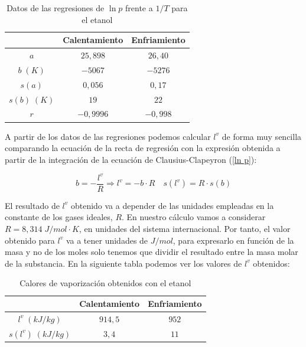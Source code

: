 \documentclass[a4paper,12pt,titlepage]{article}
\begin{document}
\begin{table}[h!]
\centering
\begin{tabular}{c|c|c|}
\cline{2-3}
                                  & Calentamiento & Enfriamiento \\ \hline
\multicolumn{1}{|c|}{$a$}         & $25,898$ & $26,40$ \\ \hline
\multicolumn{1}{|c|}{$b\;(K)$}    & $-5067$ & $-5276$ \\ \hline
\multicolumn{1}{|c|}{$s(a)$}      & $0,056$ & $0,17$ \\ \hline
\multicolumn{1}{|c|}{$s(b)\;(K)$} & $19$ & $22$ \\ \hline
\multicolumn{1}{|c|}{$r$}         & $-0,9996$ & $-0,998$ \\ \hline
\end{tabular}
\caption{Datos de las regresiones de $\ln p$ frente a $1/T$ para el etanol}
\label{tab:my-table}
\end{table}

A partir de los datos de las regresiones podemos calcular $l^v$ de forma muy sencilla comparando la ecuación de la recta de regresión con la expresión obtenida a partir de la integración de la ecuación de Clausius-Clapeyron (\ref{ln p}):

\begin{equation}
    b = -\frac{l^v}{R} \Rightarrow l^v = -b\cdot R \quad s(l^v) = R\cdot s(b)
    \label{s_l^v}
\end{equation}

El resultado de $l^v$ obtenido va a depender de las unidades empleadas en la constante de los gases ideales, $R$. En nuestro cálculo vamos a considerar $R=8,314 \;J/mol\cdot K$, en unidades del sistema internacional. Por tanto, el valor obtenido para $l^v$ va a tener unidades de $J/mol$, para expresarlo en función de la masa y no de los moles solo tenemos que dividir el resultado entre la masa molar de la substancia. En la siguiente tabla podemos ver los valores de $l^v$ obtenidos:

\begin{table}[h!]
\centering
\begin{tabular}{c|c|c|}
\cline{2-3}
    & Calentamiento & Enfriamiento \\ \hline
\multicolumn{1}{|c|}{$l^v\;(kJ/kg)$}    & $914,5$ & $952$ \\ \hline
\multicolumn{1}{|c|}{$s(l^v)\;(kJ/kg)$} & $3,4$ & $11$ \\ \hline
\end{tabular}
\caption{Calores de vaporización obtenidos con el etanol}
\label{tab:my-table}
\end{table}
\end{document}
